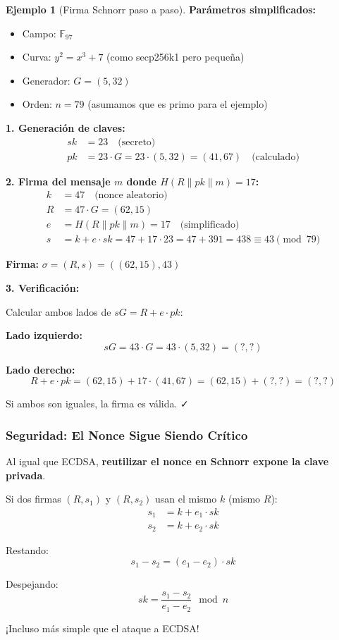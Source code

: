 \documentclass[11pt,a4paper,twoside,openright]{book}
\theoremstyle{definition}
\newtheorem{example}{Ejemplo}[chapter]
\theoremstyle{plain}
\theoremstyle{remark}
\begin{document}
\begin{example}[Firma Schnorr paso a paso]
\textbf{Parámetros simplificados:}
\begin{itemize}
    \item Campo: $\mathbb{F}_{97}$
    \item Curva: $y^2 = x^3 + 7$ (como secp256k1 pero pequeña)
    \item Generador: $G = (5, 32)$
    \item Orden: $n = 79$ (asumamos que es primo para el ejemplo)
\end{itemize}

\textbf{1. Generación de claves:}
\begin{align}
sk &= 23 \quad \text{(secreto)} \\
pk &= 23 \cdot G = 23 \cdot (5, 32) = (41, 67) \quad \text{(calculado)}
\end{align}

\textbf{2. Firma del mensaje $m$ donde $H(R \| pk \| m) = 17$:}
\begin{align}
k &= 47 \quad \text{(nonce aleatorio)} \\
R &= 47 \cdot G = (62, 15) \\
e &= H(R \| pk \| m) = 17 \quad \text{(simplificado)} \\
s &= k + e \cdot sk = 47 + 17 \cdot 23 = 47 + 391 = 438 \equiv 43 \pmod{79}
\end{align}

\textbf{Firma:} $\sigma = (R, s) = ((62, 15), 43)$

\textbf{3. Verificación:}

Calcular ambos lados de $sG = R + e \cdot pk$:

\textbf{Lado izquierdo:}
\[ sG = 43 \cdot G = 43 \cdot (5, 32) = (?, ?) \]

\textbf{Lado derecho:}
\[ R + e \cdot pk = (62, 15) + 17 \cdot (41, 67) = (62, 15) + (?, ?) = (?, ?) \]

Si ambos son iguales, la firma es válida. ✓
\end{example}

\subsubsection{Seguridad: El Nonce Sigue Siendo Crítico}

\begin{advertencia}
Al igual que ECDSA, \textbf{reutilizar el nonce en Schnorr expone la clave privada}.

Si dos firmas $(R, s_1)$ y $(R, s_2)$ usan el mismo $k$ (mismo $R$):
\begin{align}
s_1 &= k + e_1 \cdot sk \\
s_2 &= k + e_2 \cdot sk
\end{align}

Restando:
\[ s_1 - s_2 = (e_1 - e_2) \cdot sk \]

Despejando:
\[ sk = \frac{s_1 - s_2}{e_1 - e_2} \mod n \]

¡Incluso más simple que el ataque a ECDSA!
\end{advertencia}
\end{document}

